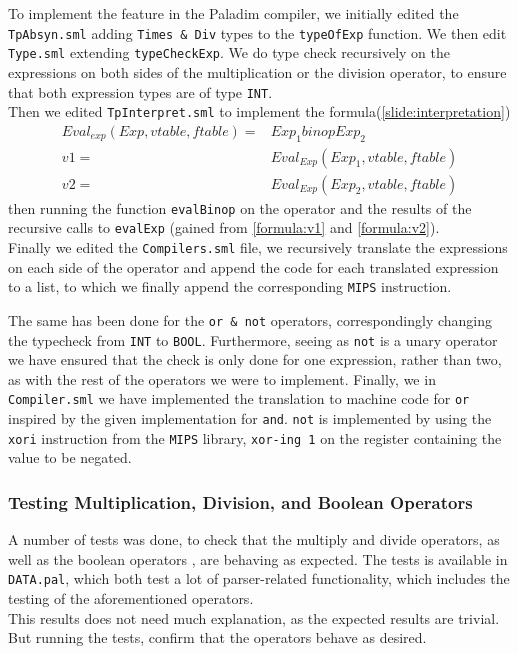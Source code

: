 \documentclass[10pt]{article}
\begin{document}
To implement the feature in the Paladim compiler, we initially edited the \texttt{TpAbsyn.sml} adding \texttt{Times \& Div} types to the \texttt{typeOfExp} function. We then edit \texttt{Type.sml} extending \texttt{typeCheckExp}. We do type check recursively on the expressions on both sides of the multiplication or the division operator, to ensure that both expression types are of type \texttt{INT}.\\
Then we edited \texttt{TpInterpret.sml} to implement the formula(\ref{slide:interpretation})
\begin{align}
Eval_{exp}(Exp, vtable, ftable) =& Exp_1 binop Exp_2\\
v1 =& Eval_{Exp} (Exp_1, vtable, ftable)\label{formula:v1}\\
v2 =& Eval_{Exp} (Exp_2, vtable, ftable)\label{formula:v2}
\end{align}
then running the function \texttt{evalBinop} on the operator and the results of the recursive calls to \texttt{evalExp} (gained from \ref{formula:v1} and \ref{formula:v2}).\\

Finally we edited the \texttt{Compilers.sml} file, we recursively translate the expressions on each side of the operator and append the code for each translated expression to a list, to which we finally append the corresponding \texttt{MIPS} instruction.

The same has been done for the \texttt{or \& not} operators, correspondingly changing the typecheck from \texttt{INT} to \texttt{BOOL}. Furthermore, seeing as \texttt{not} is a unary operator we have ensured that the check is only done for one expression, rather than two, as with the rest of the operators we were to implement. Finally, we in \texttt{Compiler.sml} we have implemented the translation to machine code for \texttt{or} inspired by the given implementation for \texttt{and}. \texttt{not} is implemented by using the \texttt{xori} instruction from the \texttt{MIPS} library, \texttt{xor-ing 1} on the register containing the value to be negated.

\subsubsection{Testing Multiplication, Division, and Boolean Operators}
A number of tests was done, to check that the multiply and divide operators, as well as the boolean operators , are behaving as expected. The tests is available in \texttt{DATA\parserTest.pal}, which both test a lot of parser-related functionality, which includes the testing of the aforementioned operators.\\ This results does not need much explanation, as the expected results are trivial. But running the tests, confirm that the operators behave as desired.
\end{document}
